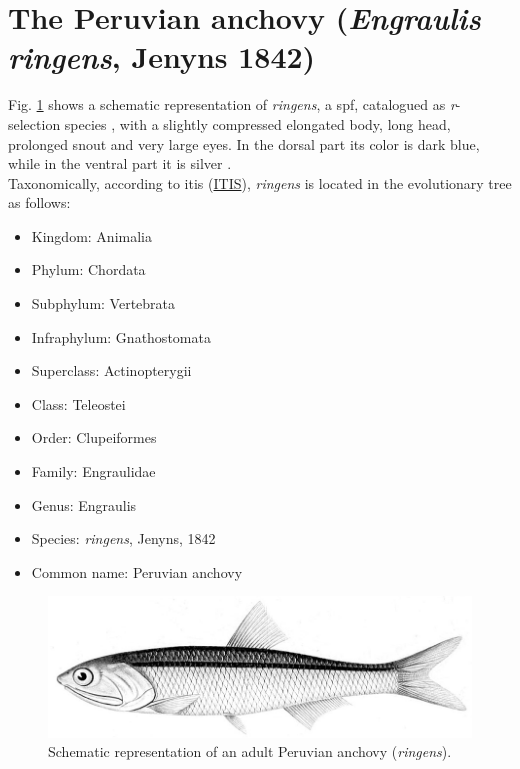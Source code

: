 \clearpage

\section{The Peruvian anchovy (\textit{Engraulis ringens}, Jenyns 1842)}\label{Chap1PeruAnch}

Fig. \ref{Chap1Engraulis_ringens} shows a schematic representation of \textit{\gls{ringens}}, a \acrshort{spf}, catalogued as \textit{r}-selection species \citep{Pianka1970}, with a slightly compressed elongated body, long head, prolonged snout and very large eyes. In the dorsal part its color is dark blue, while in the ventral part it is silver \citep{Whit1988}.\\

Taxonomically, according to \acrlong{itis} (\href{https://www.itis.gov/}{ITIS}), \textit{\gls{ringens}} is located in the evolutionary tree as follows:\\

\begin{itemize}
  \centering
  \item Kingdom: Animalia
  \item Phylum: Chordata
  \item Subphylum: Vertebrata
  \item Infraphylum: Gnathostomata
  \item Superclass: Actinopterygii
  \item Class: Teleostei
  \item Order: Clupeiformes
  \item Family: Engraulidae
  \item Genus: Engraulis
  \item Species: \textit{\gls{ringens}}, Jenyns, 1842
  \item Common name: Peruvian anchovy
\end{itemize}

\begin{figure}[ht]
	\includegraphics[width=1.0\textwidth]{figures/Chap1Engraulis_ringens.jpg}
	\centering
	\caption{Schematic representation of an adult Peruvian anchovy (\textit{\gls{ringens}}).}
	\label{Chap1Engraulis_ringens}
\end{figure}

